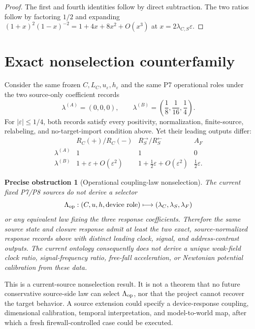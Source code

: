 \documentclass[11pt]{article}
\newtheorem{obstruction}{Precise obstruction}
\begin{document}
\begin{proof}
The first and fourth identities follow by direct subtraction.  The two ratios
follow by factoring \(1/2\) and expanding
\((1+x)^2(1-x)^{-2}=1+4x+8x^2+O(x^3)\) at
\(x=2\lambda_{C,S}\varepsilon\).
\end{proof}

\section{Exact nonselection counterfamily}

Consider the same frozen \(C,L_C,u_\varepsilon,h_\varepsilon\) and the same
P7 operational roles under the two source-only coefficient records
\[
 \lambda^{(A)}=(0,0,0),
 \qquad
 \lambda^{(B)}=\left(\frac18,\frac1{16},\frac14\right).
\]
For \(|\varepsilon|\leq 1/4\), both records satisfy every positivity,
normalization, finite-source, relabeling, and no-target-import condition above.
Yet their leading outputs differ:
\[
\begin{array}{c|ccc}
 & R_C(+)/R_C(-) & R_S^\rightarrow/R_S^\leftarrow & A_F\\
\hline
\lambda^{(A)}
 &1&1&0\\
\lambda^{(B)}
 &1+\varepsilon+O(\varepsilon^2)
 &1+\frac12\varepsilon+O(\varepsilon^2)
 &\frac12\varepsilon .
\end{array}
\]

\begin{obstruction}[Operational coupling-law nonselection]
The current fixed P7/P8 sources do not derive a selector
\[
 \Lambda_{\rm op}:
 (C,u,h,\mathrm{device\ role})
 \longmapsto(\lambda_C,\lambda_S,\lambda_F)
\]
or any equivalent law fixing the three response coefficients.  Therefore the
same source state and closure response admit at least the two exact,
source-normalized response records above with distinct leading clock, signal,
and address-contrast outputs.  The current ontology consequently does not
derive a unique weak-field clock ratio, signal-frequency ratio, free-fall
acceleration, or Newtonian potential calibration from these data.
\end{obstruction}

This is a current-source nonselection result.  It is not a theorem that no
future conservative source-side law can select \(\Lambda_{\rm op}\), nor that
the project cannot recover the target behavior.  A source extension could
specify a device-response coupling, dimensional calibration, temporal
interpretation, and model-to-world map, after which a fresh firewall-controlled
case could be executed.
\end{document}
